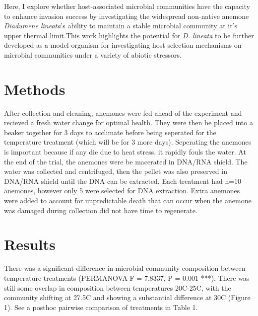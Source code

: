 \documentclass[
]{article}
\begin{document}
Here, I explore whether host-associated microbial communities have the
capacity to enhance invasion success by investigating the widespread
non-native anemone \emph{Diadumene lineata}'s ability to maintain a
stable microbial community at it's upper thermal limit.This work
highlights the potential for \emph{D. lineata} to be further developed
as a model organism for investigating host selection mechanisms on
microbial communities under a variety of abiotic stressors.

\hypertarget{methods}{%
\section{Methods}\label{methods}}

After collection and cleaning, anemones were fed ahead of the experiment
and recieved a fresh water change for optimal health. They were then be
placed into a beaker together for 3 days to acclimate before being
seperated for the temperature treatment (which will be for 3 more days).
Seperating the anemones is important because if any die due to heat
stress, it rapidly fouls the water. At the end of the trial, the
anemones were be macerated in DNA/RNA shield. The water was collected
and centrifuged, then the pellet was also preserved in DNA/RNA shield
until the DNA can be extracted. Each treatment had n=10 anemones,
however only 5 were selected for DNA extraction. Extra anemones were
added to account for unpredictable death that can occur when the anemone
was damaged during collection did not have time to regenerate.

\hypertarget{results}{%
\section{Results}\label{results}}

There was a significant difference in microbial community composition
between temperature treatments (PERMANOVA F = 7.8337, P = 0.001 ***).
There was still some overlap in composition between temperatures
20C-25C, with the community shifting at 27.5C and showing a substantial
difference at 30C (Figure 1). See a posthoc pairwise comparison of
treatments in Table 1.
\end{document}
